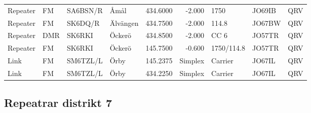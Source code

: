 \begin{landscape}
\begin{longtable}{llllrrlll}
	Repeater          & FM              & SA6BSN/R & Åmål                  &     434.6000 &     -2.000 & 1750              & JO69IB      & QRV      \\
	Repeater          & FM              & SK6DQ/R  & Älvängen              &     434.7500 &     -2.000 & 114.8             & JO67BW      & QRV      \\
	Repeater          & DMR             & SK6RKI   & Öckerö                &     434.8500 &     -2.000 & CC 6              & JO57TR      & QRV      \\
	Repeater          & FM              & SK6RKI   & Öckerö                &     145.7500 &     -0.600 & 1750/114.8        & JO57TR      & QRV      \\
	Link              & FM              & SM6TZL/L & Örby                  &     145.2375 &    Simplex & Carrier           & JO67IL      & QRV      \\
	Link              & FM              & SM6TZL/L & Örby                  &     434.2250 &    Simplex & Carrier           & JO67IL      & QRV
\end{longtable}


\clearpage

\subsection{Repeatrar distrikt 7}


\end{landscape}
